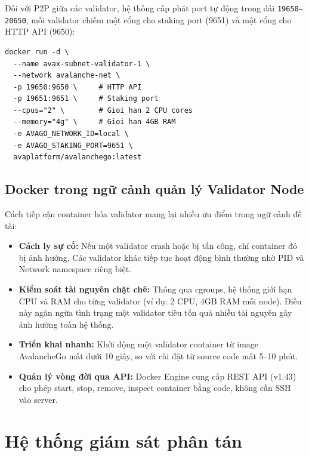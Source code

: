 Đối với P2P giữa các validator, hệ thống cấp phát port tự động trong dải \texttt{19650--20650}, mỗi validator chiếm một cổng cho staking port (9651) và một cổng cho HTTP API (9650):

\begin{lstlisting}[caption={Cấu hình Docker Container cho Validator Node}, label={lst:docker_validator}, language={}]
docker run -d \
  --name avax-subnet-validator-1 \
  --network avalanche-net \
  -p 19650:9650 \     # HTTP API
  -p 19651:9651 \     # Staking port
  --cpus="2" \        # Gioi han 2 CPU cores
  --memory="4g" \     # Gioi han 4GB RAM
  -e AVAGO_NETWORK_ID=local \
  -e AVAGO_STAKING_PORT=9651 \
  avaplatform/avalanchego:latest
\end{lstlisting}

\subsection{Docker trong ngữ cảnh quản lý Validator Node}

Cách tiếp cận container hóa validator mang lại nhiều ưu điểm trong ngữ cảnh đề tài:

\begin{itemize}
    \item \textbf{Cách ly sự cố:} Nếu một validator crash hoặc bị tấn công, chỉ container đó bị ảnh hưởng. Các validator khác tiếp tục hoạt động bình thường nhờ PID và Network namespace riêng biệt.

    \item \textbf{Kiểm soát tài nguyên chặt chẽ:} Thông qua cgroups, hệ thống giới hạn CPU và RAM cho từng validator (ví dụ: 2 CPU, 4GB RAM mỗi node). Điều này ngăn ngừa tình trạng một validator tiêu tốn quá nhiều tài nguyên gây ảnh hưởng toàn hệ thống.

    \item \textbf{Triển khai nhanh:} Khởi động một validator container từ image AvalancheGo mất dưới 10 giây, so với cài đặt từ source code mất 5--10 phút.

    \item \textbf{Quản lý vòng đời qua API:} Docker Engine cung cấp REST API (v1.43) cho phép start, stop, remove, inspect container bằng code, không cần SSH vào server.
\end{itemize}


\section{Hệ thống giám sát phân tán}

